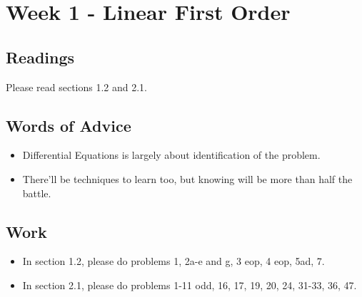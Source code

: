 

	\section{Week 1 - Linear First Order}

	\subsection{Readings}
		Please read sections 1.2 and 2.1.

	\subsection{Words of Advice}
		\begin{itemize}
			\item Differential Equations is largely about identification of the problem.
			\item There'll be techniques to learn too, but knowing will be more than half the battle.
		\end{itemize}

	\subsection{Work}
		\begin{itemize}
			\item In section 1.2, please do problems 1, 2a-e and g, 3 eop, 4 eop, 5ad, 7.
			\item In section 2.1, please do problems 1-11 odd, 16, 17, 19, 20, 24, 31-33, 36, 47.
		\end{itemize}

	\clearpage



